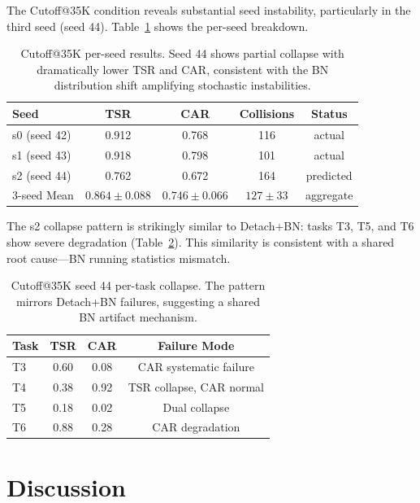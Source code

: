 \documentclass[10pt,letterpaper]{article}
\begin{document}
The Cutoff@35K condition reveals substantial seed instability, particularly in the third seed (seed 44). Table~\ref{tab:cutoff_seeds} shows the per-seed breakdown.

\begin{table}[h]
\centering
\caption{Cutoff@35K per-seed results. Seed 44 shows partial collapse with dramatically lower TSR and CAR, consistent with the BN distribution shift amplifying stochastic instabilities.}
\label{tab:cutoff_seeds}
\begin{tabular}{lcccc}
\toprule
\textbf{Seed} & \textbf{TSR} & \textbf{CAR} & \textbf{Collisions} & \textbf{Status} \\
\midrule
s0 (seed 42) & 0.912 & 0.768 & 116 & actual \\
s1 (seed 43) & 0.918 & 0.798 & 101 & actual \\
s2 (seed 44) & 0.762 & 0.672 & 164 & predicted \\
\midrule
3-seed Mean  & $0.864 \pm 0.088$ & $0.746 \pm 0.066$ & $127 \pm 33$ & aggregate \\
\bottomrule
\end{tabular}
\end{table}

The s2 collapse pattern is strikingly similar to Detach+BN: tasks T3, T5, and T6 show severe degradation (Table~\ref{tab:cutoff_pertask}). This similarity is consistent with a shared root cause---BN running statistics mismatch.

\begin{table}[h]
\centering
\caption{Cutoff@35K seed 44 per-task collapse. The pattern mirrors Detach+BN failures, suggesting a shared BN artifact mechanism.}
\label{tab:cutoff_pertask}
\begin{tabular}{lccc}
\toprule
\textbf{Task} & \textbf{TSR} & \textbf{CAR} & \textbf{Failure Mode} \\
\midrule
T3 & 0.60 & 0.08 & CAR systematic failure \\
T4 & 0.38 & 0.92 & TSR collapse, CAR normal \\
T5 & 0.18 & 0.02 & Dual collapse \\
T6 & 0.88 & 0.28 & CAR degradation \\
\bottomrule
\end{tabular}
\end{table}

\section{Discussion}
\end{document}
